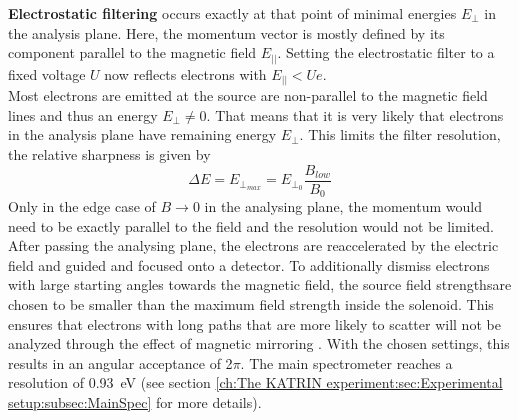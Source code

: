 		{\bf Electrostatic filtering} occurs exactly at that point of minimal energies $E_\bot$ in the analysis plane. Here, the momentum vector is mostly defined by its component parallel to the magnetic field $E_{||}$. Setting the electrostatic filter to a fixed voltage $U$ now reflects electrons with $E_{||} < Ue$.\\
		Most electrons are emitted at the source are non-parallel to the magnetic field lines and thus an energy $E_\bot \neq 0$. That means that it is very likely that electrons in the analysis plane have remaining energy $E_\bot$. This limits the filter resolution, the relative sharpness is given by
		\begin{equation}
		\Delta E = E_{\bot_{max}} = E_{\bot_0}\frac{B_{low}}{B_{0}}
		\end{equation}
		Only in the edge case of $B\rightarrow 0$ in the analysing plane, the momentum would need to be exactly parallel to the field and the resolution would not be limited.
		After passing the analysing plane, the electrons are reaccelerated by the electric field and guided and focused onto a detector.
		To additionally dismiss electrons with large starting angles towards the magnetic field, the source field strengthsare chosen to be smaller than the maximum field strength inside the solenoid. This ensures that electrons with long paths that are more likely to scatter will not be analyzed through the effect of magnetic mirroring \cite{magneticMirror}.
		With the chosen settings, this results in an angular acceptance of 2$\pi$. The main spectrometer reaches a resolution of \SI{0.93}{\electronvolt} (see section \ref{ch:The KATRIN experiment:sec:Experimental setup:subsec:MainSpec} for more details).
%       
